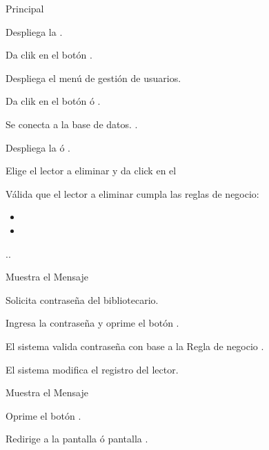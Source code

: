 	\begin{UCtrayectoria}{Principal}
	
		\UCpaso Despliega la .

		\UCpaso[\UCactor] Da clik en el botón .

		\UCpaso Despliega el menú de gestión de usuarios. 

		\UCpaso[\UCactor] Da clik en el botón  ó .\label{CU4.2ConectarBaseDatos}

		\UCpaso Se conecta a la base de datos. .

		\UCpaso Despliega la  ó .

		\UCpaso[\UCactor] Elige el lector a eliminar y da click en el \label{CU4.1EliminarLector}

		\UCpaso Válida que el lector a eliminar cumpla las reglas de negocio: 
				
			\begin{itemize}
				\item	{} 
				\item	{} 

			\end{itemize} 
		..


		\UCpaso Muestra el Mensaje \label{CU4.3Contrasena}

		\UCpaso Solicita contraseña del bibliotecario.

		\UCpaso[\UCactor] Ingresa la contraseña y oprime el botón .

		\UCpaso El sistema valida contraseña con base a la Regla de negocio  .

		\UCpaso El sistema modifica el registro del lector.

		\UCpaso Muestra el Mensaje 

		\UCpaso[\UCactor] Oprime el botón .

		\UCpaso Redirige a la pantalla  ó pantalla .		
	\end{UCtrayectoria}



